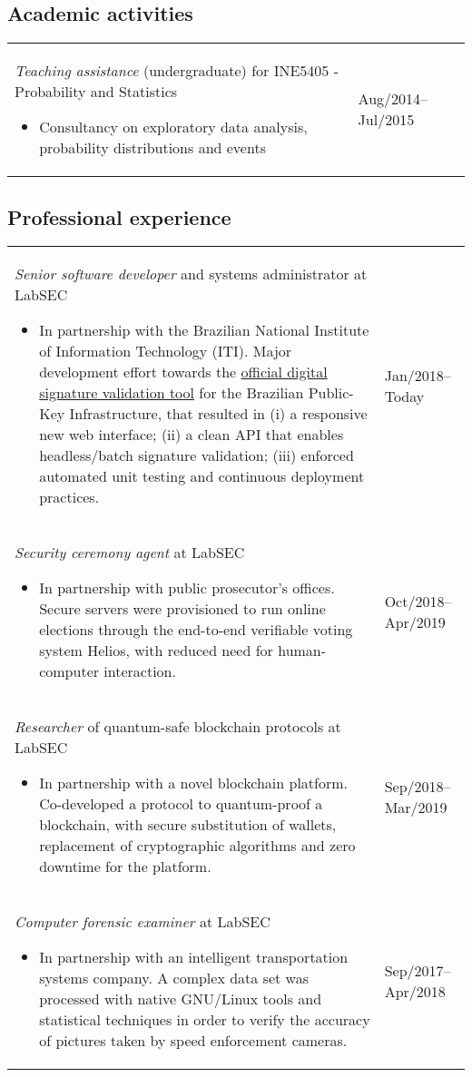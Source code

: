 \documentclass[12pt]{article}
\makeatletter
\newenvironment{datetable}
  {\newcolumntype{R}{>{\raggedleft\arraybackslash}p{0.14\textwidth}}
   \newcolumntype{L}{p{0.82\textwidth}}
   \begin{tabular}{@{\hspace{0mm}}LR}}
  {\end{tabular}}
\newenvironment{contenttable}[1]
  {\subsection*{#1}
   \begin{datetable}}
  {\end{datetable}}
\makeatother
\begin{document}
\begin{contenttable}{Academic activities}
  \textit{Teaching assistance} (undergraduate) for INE5405 - Probability and
    Statistics
  \begin{itemize}
    \item Consultancy on exploratory data analysis, probability distributions
        and events
  \end{itemize} & Aug/2014--Jul/2015 \\
\end{contenttable}

\begin{contenttable}{Professional experience}
  \textit{Senior software developer} and systems administrator at LabSEC
  \begin{itemize}
    \item In partnership with the Brazilian National Institute of Information
        Technology (ITI). Major development effort towards the
          \href{https://verificador.iti.gov.br}{official digital signature
          validation tool} for the Brazilian Public-Key Infrastructure, that
          resulted in (i) a responsive new web interface; (ii) a clean API that
          enables headless/batch signature validation; (iii) enforced automated
          unit testing and continuous deployment practices.
  \end{itemize} & Jan/2018--Today \\

  \textit{Security ceremony agent} at LabSEC
  \begin{itemize}
    \item In partnership with public prosecutor's offices. Secure servers were
        provisioned to run online elections through the end-to-end verifiable
          voting system Helios, with reduced need for human-computer
          interaction.
  \end{itemize} & Oct/2018--Apr/2019 \\

  \textit{Researcher} of quantum-safe blockchain protocols at LabSEC
  \begin{itemize}
    \item In partnership with a novel blockchain platform. Co-developed a
        protocol to quantum-proof a blockchain, with secure substitution of
          wallets, replacement of cryptographic algorithms and zero downtime
          for the platform.
  \end{itemize} & Sep/2018--Mar/2019 \\

  \textit{Computer forensic examiner} at LabSEC
  \begin{itemize}
    \item In partnership with an intelligent transportation systems company. A
        complex data set was processed with native GNU/Linux tools and
          statistical techniques in order to verify the accuracy of pictures
          taken by speed enforcement cameras.
  \end{itemize} & Sep/2017--Apr/2018 \\


\end{contenttable}
\end{document}
